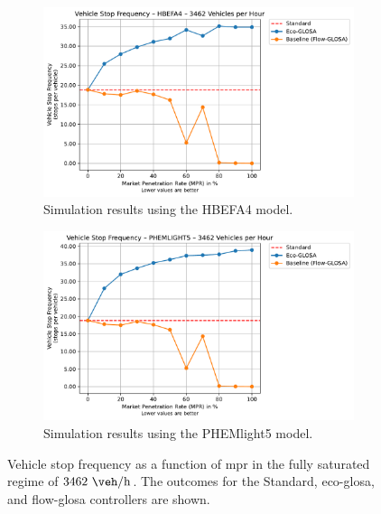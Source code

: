 \begin{figure}[htb]
  \centering
  \begin{subfigure}[b]{0.45\textwidth}
    \includegraphics[width=\textwidth]{data/img/VehicleStopFrequency/VehicleStopFrequency_HBEFA4_Cars3462.pdf}
    \caption{Simulation results using the HBEFA4 model.}
    \label{fig:StopFreq_3462_HBEFA4}
  \end{subfigure}\hfill
  \begin{subfigure}[b]{0.45\textwidth}
    \includegraphics[width=\textwidth]{data/img/VehicleStopFrequency/VehicleStopFrequency_PHEMLIGHT5_Cars3462.pdf}
    \caption{Simulation results using the PHEMlight5 model.}
    \label{fig:StopFreq_3462_PHEM}
  \end{subfigure}
  \caption[Vehicle stop frequency vs. \ac{mpr} at $3462~\unit{\veh\per\hour}$]{Vehicle stop frequency as a function of \ac{mpr} in the fully saturated regime of $3462~\unit{\veh\per\hour}$. The outcomes for the Standard, \ac{eco-glosa}, and \ac{flow-glosa} controllers are shown.}
  \label{fig:StopFreq_3462}
\end{figure}

